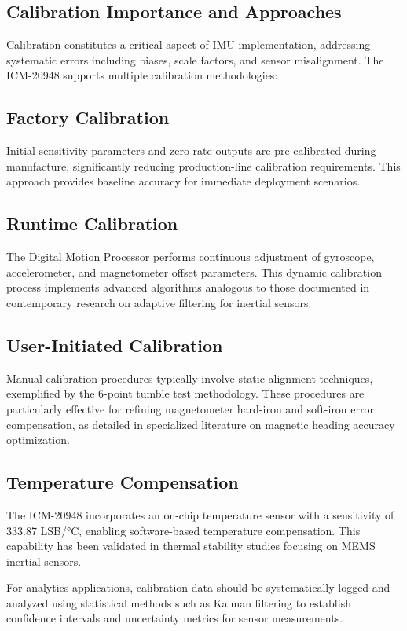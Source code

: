 \subsection{Calibration Importance and Approaches}
Calibration constitutes a critical aspect of IMU implementation, addressing systematic errors including biases, scale factors, and sensor misalignment. The ICM-20948 supports multiple calibration methodologies:

\subsection{Factory Calibration}
Initial sensitivity parameters and zero-rate outputs are pre-calibrated during manufacture, significantly reducing production-line calibration requirements. This approach provides baseline accuracy for immediate deployment scenarios.

\subsection{Runtime Calibration}
The Digital Motion Processor performs continuous adjustment of gyroscope, accelerometer, and magnetometer offset parameters. This dynamic calibration process implements advanced algorithms analogous to those documented in contemporary research on adaptive filtering for inertial sensors.

\subsection{User-Initiated Calibration}
Manual calibration procedures typically involve static alignment techniques, exemplified by the 6-point tumble test methodology. These procedures are particularly effective for refining magnetometer hard-iron and soft-iron error compensation, as detailed in specialized literature on magnetic heading accuracy optimization.

\subsection{Temperature Compensation}
The ICM-20948 incorporates an on-chip temperature sensor with a sensitivity of 333.87 LSB/°C, enabling software-based temperature compensation. This capability has been validated in thermal stability studies focusing on MEMS inertial sensors.

For analytics applications, calibration data should be systematically logged and analyzed using statistical methods such as Kalman filtering to establish confidence intervals and uncertainty metrics for sensor measurements.

